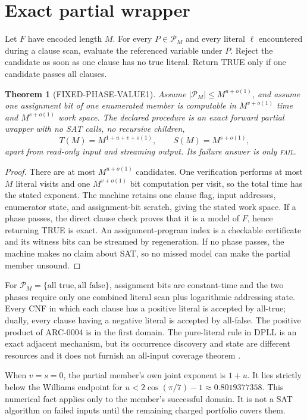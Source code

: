 \documentclass[11pt]{article}
\newtheorem{theorem}{Theorem}
\begin{document}
\section{Exact partial wrapper}
Let $F$ have encoded length $M$.  For every $P\in\mathcal P_M$ and every
literal $\ell$ encountered during a clause scan, evaluate the referenced
variable under $P$.  Reject the candidate as soon as one clause has no true
literal.  Return TRUE only if one candidate passes all clauses.

\begin{theorem}[FIXED-PHASE-VALUE1]
Assume $|\mathcal P_M|\le M^{u+o(1)}$, and assume one assignment bit of one
enumerated member is computable in $M^{v+o(1)}$ time and $M^{s+o(1)}$ work
space.  The declared procedure is an exact forward partial wrapper with no
SAT calls, no recursive children,
\[
 T(M)=M^{1+u+v+o(1)},\qquad S(M)=M^{s+o(1)},
\]
apart from read-only input and streaming output.  Its failure answer is only
\textsc{fail}.
\end{theorem}
\begin{proof}
There are at most $M^{u+o(1)}$ candidates.  One verification performs at
most $M$ literal visits and one $M^{v+o(1)}$ bit computation per visit, so
the total time has the stated exponent.  The machine retains one clause flag,
input addresses, enumerator state, and assignment-bit scratch, giving the
stated work space.  If a phase passes, the direct clause check proves that it
is a model of $F$, hence returning TRUE is exact.  An assignment-program
index is a checkable certificate and its witness bits can be streamed by
regeneration.  If no phase passes, the machine makes no claim about SAT, so
no missed model can make the partial member unsound.
\end{proof}

For $\mathcal P_M=\{\text{all true},\text{all false}\}$, assignment bits are
constant-time and the two phases require only one combined literal scan plus
logarithmic addressing state.  Every CNF in which each clause has a positive
literal is accepted by all-true; dually, every clause having a negative
literal is accepted by all-false.  The positive product of ARC-0004 is in the
first domain.  The pure-literal rule in DPLL is an exact adjacent mechanism,
but its occurrence discovery and state are different resources and it does
not furnish an all-input coverage theorem \cite{davis1962dpll}.

When $v=s=0$, the partial member's own joint exponent is $1+u$.  It lies
strictly below the Williams endpoint for
$u<2\cos(\pi/7)-1\approx0.8019377358$.  This numerical fact applies only to
the member's successful domain.  It is not a SAT algorithm on failed inputs
until the remaining charged portfolio covers them.
\end{document}
